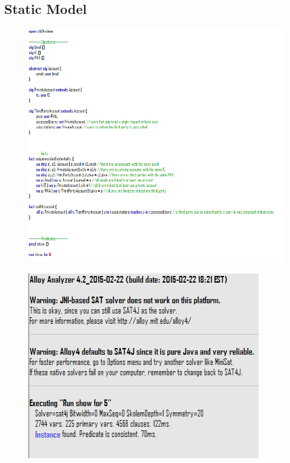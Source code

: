\documentclass[titlepage]{article}
\begin{document}
		\subsection{Static Model}
		\begin{figure}[H]
			\center
  			\includegraphics[width=\textwidth]{Alloy/staticAlloy.png}
			\label{fig:staticAlloy}
		\end{figure}

		\begin{figure}[H]
			\center
  			\includegraphics[width=\textwidth]{Alloy/staticCheck.png}
 			\label{fig:staticCheckl}
		\end{figure}
		
\end{document}

